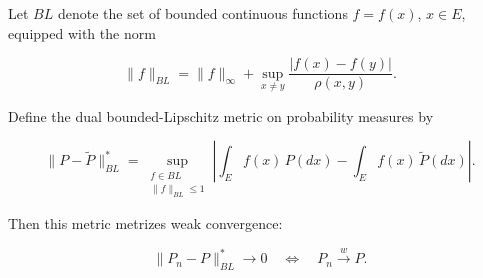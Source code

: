 Let $BL$ denote the set of bounded continuous functions $f = f(x)$, $x \in E$, equipped with the norm

$$\|f\|_{BL} = \|f\|_\infty + \sup_{x \neq y} \frac{|f(x) - f(y)|}{\rho(x, y)}.$$

Define the dual bounded-Lipschitz metric on probability measures by

$$\|P - \tilde{P}\|_{BL}^* = \sup_{\substack{f \in BL \\ \|f\|_{BL} \leq 1}} \left| \int_E f(x) \, P(dx) - \int_E f(x) \, \tilde{P}(dx) \right|.$$

Then this metric metrizes weak convergence:

$$\|P_n - P\|_{BL}^* \to 0 \quad\Longleftrightarrow\quad P_n \xrightarrow{w} P.$$
